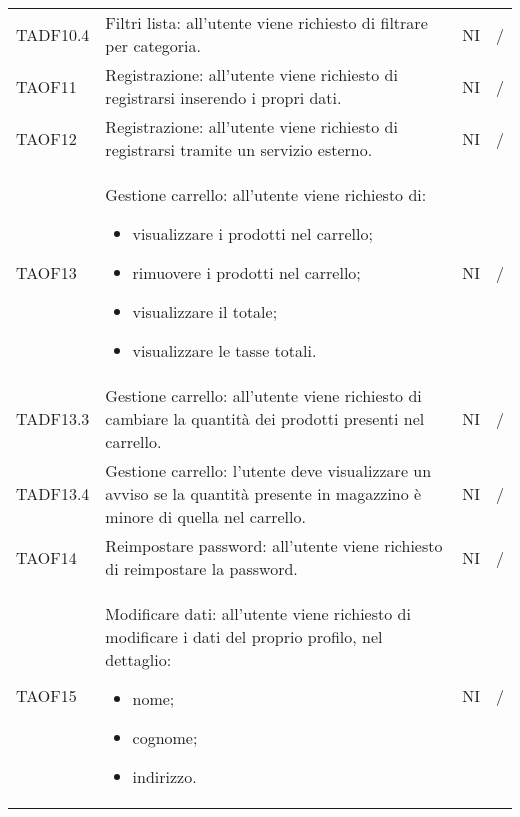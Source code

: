 \begin{center}
\begin{longtable}[!h]{p{60px} p{240px} p{35px} p{35px}}
        TADF10.4                         & Filtri lista: all'utente viene richiesto di filtrare per categoria.                                                                                                 & NI             & /             \\
        TAOF11                           & Registrazione: all'utente viene richiesto di registrarsi inserendo i propri dati.                                                                                   & NI             & /             \\
        TAOF12                           & Registrazione: all'utente viene richiesto di registrarsi tramite un servizio esterno.                                                                               & NI             & /             \\
        TAOF13                           & Gestione carrello: all'utente viene richiesto di: \begin{itemize} \item visualizzare i prodotti nel carrello; \item rimuovere i prodotti nel carrello; \item visualizzare il totale; \item visualizzare le tasse totali. \end{itemize}                                                                                        & NI             & /             \\
        TADF13.3                         & Gestione carrello: all'utente viene richiesto di cambiare la quantità dei prodotti presenti nel carrello.                                                           & NI             & /             \\
        TADF13.4                         & Gestione carrello: l'utente deve visualizzare un avviso se la quantità presente in magazzino è minore di quella nel carrello.                                       & NI             & /             \\
        TAOF14                           & Reimpostare password: all'utente viene richiesto di reimpostare la password.                                                                                        & NI             & /             \\
        TAOF15                           & Modificare dati: all'utente viene richiesto di modificare i dati del proprio profilo, nel dettaglio: \begin{itemize} \item nome; \item cognome; \item indirizzo. \end{itemize}                                     & NI             & /             \\

\end{longtable}
\end{center}

